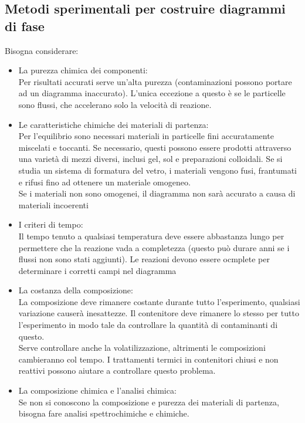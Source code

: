 \documentclass{article}
\begin{document}
\subsection{Metodi sperimentali per costruire diagrammi di fase}
Bisogna considerare:
\begin{itemize}
    \item La purezza chimica dei componenti:\\
    Per risultati accurati serve un'alta purezza (contaminazioni possono portare ad un diagramma inaccurato). L'unica eccezione a questo è se le particelle sono flussi, che accelerano solo la velocità di reazione.
    \item Le caratteristiche chimiche dei materiali di partenza: \\
    Per l'equilibrio sono necessari materiali in particelle fini accuratamente miscelati e toccanti.
    Se necessario, questi possono essere prodotti attraverso una varietà di mezzi diversi, inclusi gel, sol e preparazioni colloidali.
    Se si studia un sistema di formatura del vetro, i materiali vengono fusi, frantumati e rifusi fino ad ottenere un materiale omogeneo.
    \\ Se i materiali non sono omogenei, il diagramma non sarà accurato a causa di materiali incoerenti
    \item I criteri di tempo:\\
    Il tempo tenuto a qualsiasi temperatura deve essere abbastanza lungo per permettere che la reazione vada a completezza (questo può durare anni se i flussi non sono stati aggiunti). Le reazioni devono essere ocmplete per determinare i corretti campi nel diagramma
    \item La costanza della composizione:
    \\La composizione deve rimanere costante durante tutto l'esperimento, qualsiasi variazione causerà inesattezze. Il contenitore deve rimanere lo stesso per tutto l'esperimento in modo tale da controllare la quantità di contaminanti di questo. \\ Serve controllare anche la volatilizzazione, altrimenti le composizioni cambieranno col tempo. I trattamenti termici in contenitori chiusi e non reattivi possono aiutare a controllare questo problema.
    \item La composizione chimica e l'analisi chimica:\\
    Se non si conoscono la composizione e purezza dei materiali di partenza, bisogna fare analisi spettrochimiche e chimiche.\\

\end{itemize}
\end{document}
